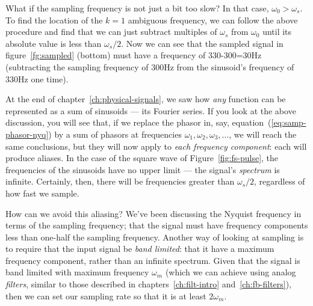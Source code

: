 What if the sampling frequency is not just a bit too slow? In that
case, $\omega_0 > \omega_s$. To find the location of the $k=1$
ambiguous frequency, we can follow the above procedure and find that
we can just subtract multiples of $\omega_s$ from $\omega_0$ until its
absolute value is less than $\omega_s/2$.  Now we can see that the
sampled signal in figure~\ref{fg:sampled} (bottom) must have a frequency of
330-300=30Hz (subtracting the sampling frequency of 300Hz from the
sinusoid's frequency of 330Hz one time).

At the end of chapter~\ref{ch:physical-signals}, we saw how
\emph{any} function can be represented as a sum of sinusoids --- its
Fourier series. If you look at the above discussion, you will see
that, if we replace the phasor in, say,
equation~(\ref{eq:samp-phasor-nyq}) by a sum of phasors at frequencies
$\omega_1, \omega_2, \omega_3, \ldots$, we will reach the same
conclusions, but they will now apply to \emph{each frequency
  component}: each will produce aliases. In the case of the square
wave of Figure~\ref{fig:fs-pulse}, the frequencies of the sinusoids
have no upper limit --- the signal's \emph{spectrum} is infinite.
Certainly, then, there will be frequencies greater than $\omega_s/2$,
regardless of how fast we sample.

How can we avoid this aliasing? We've been discussing the Nyquist
frequency in terms of the sampling frequency; that the signal must
have frequency components less than one-half the sampling frequency.
Another way of looking at sampling is to require that the input signal
be \emph{band limited}: that it have a maximum frequency component,
rather than an infinite spectrum. Given that the signal is band
limited with maximum frequency $\omega_m$ (which we can achieve using
analog \emph{filters}, similar to those described in
chapters~\ref{ch:filt-intro} and~\ref{ch:fb-filters}), then we can set
our sampling rate so that it is at least $2\omega_m$.



